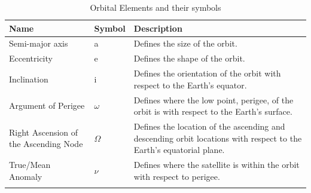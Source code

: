 \documentclass[12pt]{article}
\begin{document}
\begin{table}[]
	\caption{Orbital Elements and their symbols\cite{nasaOE}}
	\label{tab:NASA_Orbt_elem}
	
	\begin{tabular}{|p{3.75cm}|l|p{10.25cm}|}
		\hline
		Name & Symbol & Description               \\ \hline
		Semi-major axis & a & Defines the size of the orbit. \\ \hline
		Eccentricity & e & Defines the shape of the orbit. \\ \hline
		Inclination & i & Defines the orientation of the orbit with respect to the Earth's equator. \\ \hline
		Argument of Perigee & $\omega$  & Defines where the low point, perigee, of the orbit is with respect to the Earth's surface. \\ \hline
		Right Ascension of the Ascending Node & $\Omega$  & Defines the location of the ascending and descending orbit locations with respect to the Earth's equatorial plane. \\ \hline
		True/Mean Anomaly & $\nu$  & Defines where the satellite is within the orbit with respect to perigee. \\ \hline
			
		\iffalse
		

\end{tabular}
\end{table}
\end{document}
